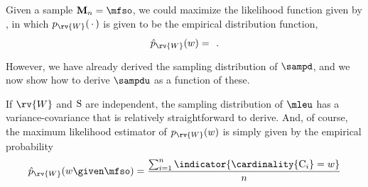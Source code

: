 \documentclass[../main.tex]{subfiles}
\begin{document}
Given a sample $\mfs = \mfso$, we could maximize the likelihood function given by \Cref{}, in which $\pmf_{\rv{W}}(\,\cdot\,)$ is given to be the empirical distribution function,
\begin{equation}
    \estimator{\pmf}_{\rv{W}}(w) = \frac{}{}\,.
\end{equation}
However, we have already derived the sampling distribution of $\sampd$, and we now show how to derive $\sampdu$ as a function of these.




If $\rv{W}$ and $\mathrm{S}$ are independent, the sampling distribution of $\mleu$ has a variance-covariance that is relatively straightforward to derive. And, of course, the maximum likelihood estimator of $\pmf_{\rv{W}}(w)$ is simply given by the empirical probability
\begin{equation}
    \estimator{\pmf}_{\rv{W}}(w \given \mfso) =
    \frac { \sum_{i=1}^{n} \indicator{\cardinality{\cand_i} = w}}
    { n }
\end{equation}
\end{document}
